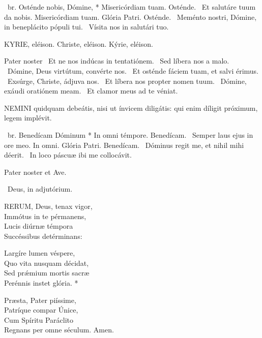 \R\ br. Osténde nobis, Dómine, * Misericórdiam tuam. Osténde. \V\ Et salutáre tuum da nobis. Misericórdiam tuam. Glória Patri. Osténde. \V\ Meménto nostri, Dómine, in beneplácito pópuli tui. \R\ Vísita nos in salutári tuo.


KYRIE, eléison. Christe, eléison. Kýrie, eléison.

Pater noster  \V\ Et ne nos indúcas in tentatiónem. \R\ Sed líbera nos a malo. \V\ Dómine, Deus virtútum, convérte nos. \R\ Et osténde fáciem tuam, et salvi érimus. \V\ Exsúrge, Christe, ádjuva nos. \R\ Et líbera nos propter nomen tuum. \V\ Dómine, exáudi oratiónem meam. \R\ Et clamor meus ad te véniat.




\lettrine[lines=2]{N}{EMINI} quidquam debeátis, nisi ut ínvicem diligátis: qui enim díligit próximum, legem implévit.

\R\ br. Benedícam Dóminum * In omni témpore. Benedícam. \V\ Semper laus ejus in ore meo. In omni. Glória Patri. Benedícam. \V\ Dóminus regit me, et nihil mihi déerit. \R\ In loco páscuæ ibi me collocávit.



\sectionornament


Pater noster et Ave.

\V\ Deus, in adjutórium.


\lettrine[lines=2]{R}{ERUM}, Deus, tenax vigor,\\
Immótus in te pérmanens,\\
Lucis diúrnæ témpora\\
Succéssibus detérminans:

Largíre lumen véspere,\\
Quo vita nusquam décidat,\\
Sed prǽmium mortis sacræ\\
Perénnis instet glória. *

Præsta, Pater piíssime,\\
Patríque compar Únice,\\
Cum Spíritu Paráclito\\
Regnans per omne séculum. Amen.

